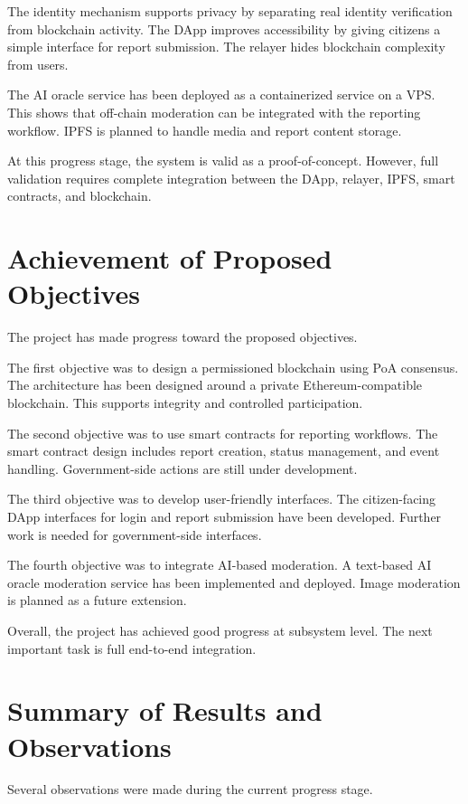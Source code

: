 The identity mechanism supports privacy by separating real identity verification from blockchain activity. The DApp improves accessibility by giving citizens a simple interface for report submission. The relayer hides blockchain complexity from users.

The AI oracle service has been deployed as a containerized service on a VPS. This shows that off-chain moderation can be integrated with the reporting workflow. IPFS is planned to handle media and report content storage.

At this progress stage, the system is valid as a proof-of-concept. However, full validation requires complete integration between the DApp, relayer, IPFS, smart contracts, and blockchain.

\section{Achievement of Proposed Objectives}

The project has made progress toward the proposed objectives.

The first objective was to design a permissioned blockchain using PoA consensus. The architecture has been designed around a private Ethereum-compatible blockchain. This supports integrity and controlled participation.

The second objective was to use smart contracts for reporting workflows. The smart contract design includes report creation, status management, and event handling. Government-side actions are still under development.

The third objective was to develop user-friendly interfaces. The citizen-facing DApp interfaces for login and report submission have been developed. Further work is needed for government-side interfaces.

The fourth objective was to integrate AI-based moderation. A text-based AI oracle moderation service has been implemented and deployed. Image moderation is planned as a future extension.

Overall, the project has achieved good progress at subsystem level. The next important task is full end-to-end integration.

\section{Summary of Results and Observations}

Several observations were made during the current progress stage.


